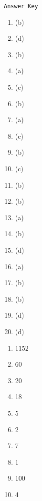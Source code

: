 \begin{center}
\texttt{Answer Key}
\begin{multicols}{3}
\begin{enumerate}
\item (b)
\item (d)
\item (b)
\item (a)
\item (c)
\item (b)
\item (a)
\item (c)
\item (b)
\item (c)
\item (b)
\item (b)
\item (a)
\item (b)
\item (d)
\item (a)
\item (b)
\item (b)
\item (d)
\item (d)
\end{enumerate}
\begin{enumerate}\addtocounter{enumi}{20}
\item 1152
\item 60
\item 20
\item 18
\item 5
\item 2
\item 7
\item 1
\item 100
\item 4
\end{enumerate}
\end{multicols}
\end{center}

